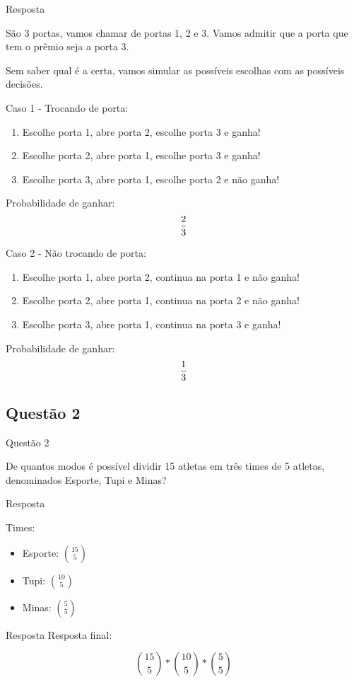 \documentclass{beamer}
\begin{document}
\begin{frame}{Resposta}

São 3 portas, vamos chamar de portas 1, 2 e 3. Vamos admitir que a porta que tem o prêmio seja a porta 3.

Sem saber qual é a certa, vamos simular as possíveis escolhas com as possíveis decisões.

\end{frame}

\begin{frame}
	Caso 1 - Trocando de porta:
	\begin{enumerate}
		\item Escolhe porta 1, abre porta 2, escolhe porta 3 e ganha!
		\item Escolhe porta 2, abre porta 1, escolhe porta 3 e ganha!
		\item Escolhe porta 3, abre porta 1, escolhe porta 2 e não ganha!
	\end{enumerate}
	 Probabilidade de ganhar: $${2\over 3}$$
\end{frame}

\begin{frame}
	Caso 2 - Não trocando de porta:
	\begin{enumerate}
		\item Escolhe porta 1, abre porta 2, continua na porta 1 e não ganha!
		\item Escolhe porta 2, abre porta 1, continua na porta 2 e não ganha!
		\item Escolhe porta 3, abre porta 1, continua na porta 3 e ganha!
	\end{enumerate}
	 Probabilidade de ganhar: $${1\over 3}$$
\end{frame}

\subsection{Questão 2}

\begin{frame}{Questão 2}

De quantos modos é possível dividir 15 atletas em três times de 5 atletas, denominados Esporte, Tupi e Minas?


\end{frame}

\begin{frame}{Resposta}

Times:

\begin{itemize}
	\item Esporte: ${15 \choose 5}$
	\item Tupi: ${10 \choose 5}$
	\item Minas: ${5 \choose 5}$
\end{itemize}

\end{frame}
\begin{frame}{Resposta}
Resposta final:

$$ {15 \choose 5} * {10 \choose 5} * {5 \choose 5} $$

\end{frame}
\end{document}
